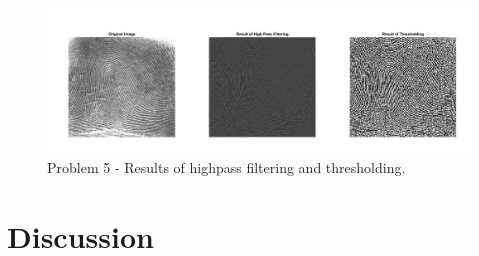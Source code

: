 \documentclass[./rarnold_report4.tex]{subfiles}
\begin{document}
	\clearpage
	
	\begin{figure}[!htbp]
	\centering
	\includegraphics[scale=0.43]{"problem5"}
	\caption{Problem 5 - Results of highpass filtering and thresholding.} 
	\label{p5}
	\end{figure}

\section*{Discussion}
\end{document}

